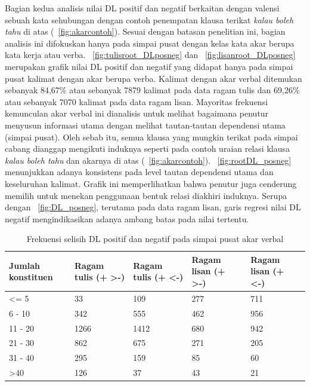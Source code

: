 Bagian kedua analisis nilai DL positif dan negatif berkaitan dengan valensi sebuah kata sehubungan dengan contoh penempatan klausa terikat \textit{kalau boleh tahu} di atas (\pic~\ref{fig:akarcontoh}). Sesuai dengan batasan penelitian ini, bagian analisis ini difokuskan hanya pada simpai pusat dengan kelas kata akar berupa kata kerja atau verba. \pic~\ref{fig:tulisroot_DLposneg} dan \pic~\ref{fig:lisanroot_DLposneg} merupakan grafik nilai DL positif dan negatif yang didapat hanya pada simpai pusat kalimat dengan akar berupa verba. Kalimat dengan akar verbal ditemukan sebanyak 84,67\% atau sebanyak 7879 kalimat pada data ragam tulis dan 69,26\% atau sebanyak 7070 kalimat pada data ragam lisan. Mayoritas frekuensi kemunculan akar verbal ini dianalisis untuk melihat bagaimana penutur menyusun informasi utama dengan melihat tautan-tautan dependensi utama (simpai pusat). Oleh sebab itu, semua klausa yang mungkin terikat pada simpai cabang dianggap mengikuti induknya seperti pada contoh uraian relasi klausa \textit{kalau boleh tahu} dan akarnya di atas (\pic~\ref{fig:akarcontoh}). \pic~\ref{fig:rootDL_posneg} menunjukkan adanya konsistens pada level tautan dependensi utama dan keseluruhan kalimat. Grafik ini memperlihatkan bahwa penutur juga cenderung memilih untuk menekan penggunaan bentuk relasi diakhiri induknya. Serupa dengan \pic~\ref{fig:DL_posneg}, terutama pada data ragam lisan, garis regresi nilai DL negatif mengindikasikan adanya ambang batas pada nilai tertentu.

\begin{table}
\begin{center}
\begin{small}
\caption{Frekuensi selisih DL positif dan negatif pada simpai pusat akar verbal}  \label{tab:DLpusatposneg}
\begin{tabular}{ | p{2cm} | p{2cm} | p{2cm} | p{2cm} | p{2cm} |}
    \hline
Jumlah konstituen & Ragam tulis (+ \textgreater -) & Ragam tulis (+ \textless -) & Ragam lisan (+ \textgreater -) & Ragam lisan (+ \textless -) \\ \hline
\textless= 5 & 33 & 109 & 277 & 711 \\ \hline
6 - 10 & 342 & 555 & 462 & 956 \\ \hline
11 - 20 & 1266 & 1412 & 680 & 942 \\ \hline
21 - 30 & 862 & 675 & 271 & 205 \\ \hline
31 - 40 & 295 & 159 & 85 & 60 \\ \hline
\textgreater 40 & 126 & 37 & 43 & 21 \\ \hline
   \end{tabular}
   \end{small}
\end{center}
\end{table}

